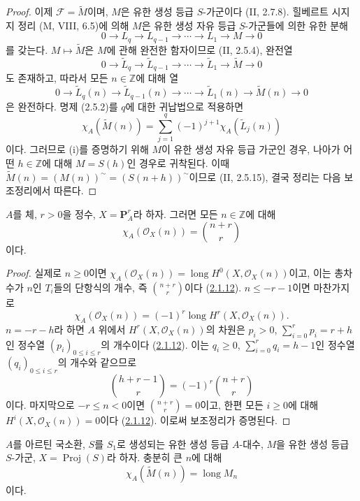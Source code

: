 \begin{proof}
이제 $\mathcal F=\widetilde M$이며, $M$은 유한 생성 등급
$S$-가군이다 (II, 2.7.8). 힐베르트 시지지 정리 (M, VIII, 6.5)에
의해 $M$은 유한 생성 자유 등급 $S$-가군들에 의한 유한 분해
\[
0\to L_q\to L_{q-1}\to\cdots\to L_1\to M\to0
\]
를 갖는다. $M\mapsto\widetilde M$은 $M$에 관해 완전한 함자이므로
(II, 2.5.4), 완전열
\[
0\to\widetilde L_q\to\widetilde L_{q-1}\to\cdots
\to\widetilde L_1\to\widetilde M\to0
\]
도 존재하고, 따라서 모든 $n\in\mathbb Z$에 대해 열
\[
0\to\widetilde L_q(n)\to\widetilde L_{q-1}(n)\to\cdots
\to\widetilde L_1(n)\to\widetilde M(n)\to0
\]
은 완전하다. 명제 (2.5.2)를 $q$에 대한 귀납법으로 적용하면
\[
\chi_A(\widetilde M(n))=\sum_{j=1}^{q}(-1)^{j+1}
\chi_A(\widetilde L_j(n))
\]
이다. 그러므로 (i)를 증명하기 위해 $M$이 유한 생성 자유 등급
가군인 경우, 나아가 어떤 $h\in\mathbb Z$에 대해 $M=S(h)$인 경우로
귀착된다. 이때
$\widetilde M(n)=(M(n))^\sim=(S(n+h))^\sim$이므로 (II, 2.5.15),
결국 정리는 다음 보조정리에서 따른다.
\end{proof}

\begin{lemma}[2.5.3.1]
\label{III.2.5.3.1-fr}
$A$를 체, $r>0$을 정수, $X=\mathbf P_A^r$라 하자. 그러면 모든
$n\in\mathbb Z$에 대해
\[
\chi_A(\mathcal O_X(n))=\binom{n+r}{r}
\]
이다.
\end{lemma}

\begin{proof}
실제로 $n\geq0$이면
$\chi_A(\mathcal O_X(n))=\operatorname{long}H^0(X,\mathcal O_X(n))$이고,
이는 총차수가 $n$인 $T_i$들의 단항식의 개수, 즉
$\binom{n+r}{r}$이다 (\hyperref[III.2.1.12-fr]{2.1.12}).
$n\leq-r-1$이면 마찬가지로
\[
\chi_A(\mathcal O_X(n))=(-1)^r
\operatorname{long}H^r(X,\mathcal O_X(n)).
\]
$n=-r-h$라 하면 $A$ 위에서 $H^r(X,\mathcal O_X(n))$의 차원은
$p_i>0$, $\sum_{i=0}^{r}p_i=r+h$인 정수열
$(p_i)_{0\leq i\leq r}$의 개수이다
(\hyperref[III.2.1.12-fr]{2.1.12}). 이는 $q_i\geq0$,
$\sum_{i=0}^{r}q_i=h-1$인 정수열 $(q_i)_{0\leq i\leq r}$의 개수와
같으므로
\[
\binom{h+r-1}{r}=(-1)^r\binom{n+r}{r}
\]
이다. 마지막으로 $-r\leq n<0$이면 $\binom{n+r}{r}=0$이고,
한편 모든 $i\geq0$에 대해 $H^i(X,\mathcal O_X(n))=0$이다
(\hyperref[III.2.1.12-fr]{2.1.12}). 이로써 보조정리가 증명된다.
\end{proof}

\begin{corollary}[2.5.4]
\label{III.2.5.4-fr}
$A$를 아르틴 국소환, $S$를 $S_1$로 생성되는 유한 생성 등급
$A$-대수, $M$을 유한 생성 등급 $S$-가군,
$X=\operatorname{Proj}(S)$라 하자. 충분히 큰 $n$에 대해
\[
\chi_A(\widetilde M(n))=\operatorname{long}M_n
\]
이다.
\end{corollary}

